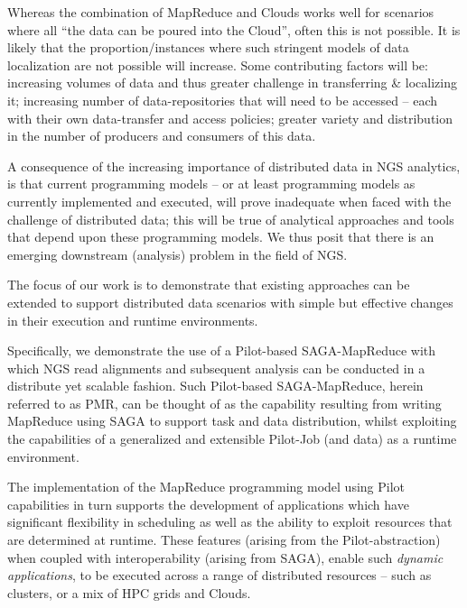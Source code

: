 \documentclass{acm_proc_article-sp}
\begin{document}
Whereas the combination of MapReduce and Clouds works well for
scenarios where all ``the data can be poured into the Cloud'', often
this is not possible.  It is likely that the proportion/instances
where such stringent models of data localization are not possible will
increase.  Some contributing factors will be: increasing volumes of
data and thus greater challenge in transferring \& localizing it;
increasing number of data-repositories that will need to be accessed
-- each with their own data-transfer and access policies; greater
variety and distribution in the number of producers and consumers of
this data. 

A consequence of the increasing importance of distributed data in NGS
analytics, is that current programming models -- or at least
programming models as currently implemented and executed, will prove
inadequate when faced with the challenge of distributed data; this
will be true of analytical approaches and tools that depend upon these
programming models. We thus posit that there is an emerging downstream
(analysis) problem in the field of NGS. 

The focus of our work is to demonstrate that existing approaches can
be extended to support distributed data scenarios with simple but
effective changes in their execution and runtime environments.

Specifically, we demonstrate the use of a Pilot-based SAGA-MapReduce
with which NGS read alignments and subsequent analysis can be
conducted in a distribute yet scalable fashion. Such Pilot-based
SAGA-MapReduce, herein referred to as PMR, can be thought of as the
capability resulting from writing MapReduce using SAGA to support task
and data distribution, whilst exploiting the capabilities of a
generalized and extensible Pilot-Job (and data) as a runtime
environment\cite{Sehgal2011590,pmr2012,pstar11}.

The implementation of the MapReduce programming model using Pilot
capabilities in turn supports the development of applications which
have significant flexibility in scheduling as well as the ability to
exploit resources that are determined at runtime.  These features
(arising from the Pilot-abstraction) when coupled with
interoperability (arising from SAGA), enable such {\it dynamic
  applications}, to be executed across a range of distributed
resources -- such as clusters, or a mix of HPC grids and Clouds.
\end{document}
